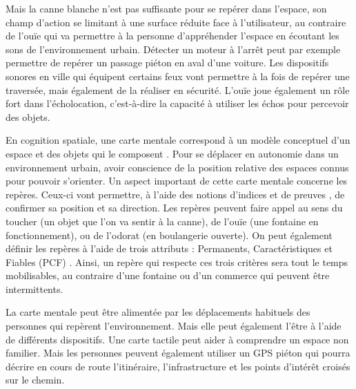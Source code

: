 Mais la canne blanche n'est pas suffisante pour se repérer dans l'espace, son champ d'action se limitant à une surface réduite face à l'utilisateur, au contraire de l'ouïe qui va permettre à la personne d'appréhender l'espace en écoutant les sons de l'environnement urbain. Détecter un moteur à l'arrêt peut par exemple permettre de repérer un passage piéton en aval d'une voiture. Les dispositifs sonores en ville qui équipent certains feux vont permettre à la fois de repérer une traversée, mais également de la réaliser en sécurité. L'ouïe joue également un rôle fort dans l'écholocation, c’est-à-dire la capacité à utiliser les échos pour percevoir des objets. \todo{}



\newpar{}

En cognition spatiale, une carte mentale correspond à un modèle conceptuel d'un espace et des objets qui le composent . Pour se déplacer en autonomie dans un environnement urbain, avoir conscience de la position relative des espaces connus pour pouvoir s'orienter. Un aspect important de cette carte mentale concerne les repères. Ceux-ci vont permettre, à l'aide des notions d'indices et de preuves , de confirmer sa position et sa direction. Les repères peuvent faire appel au sens du toucher (un objet que l'on va sentir à la canne), de l'ouïe (une fontaine en fonctionnement), ou de l'odorat (en boulangerie ouverte). On peut également définir les repères à l'aide de trois attributs : Permanents, Caractéristiques et Fiables (PCF) . Ainsi, un repère qui respecte ces trois critères sera tout le temps mobilisables, au contraire d'une fontaine ou d'un commerce qui peuvent être intermittents. 

La carte mentale peut être alimentée par les déplacements habituels des personnes qui repèrent l'environnement. Mais elle peut également l'être à l'aide de différents dispositifs. Une carte tactile peut aider à comprendre un espace non familier. Mais les personnes peuvent également utiliser un GPS piéton qui pourra décrire en cours de route l'itinéraire, l'infrastructure et les points d'intérêt croisés sur le chemin.


